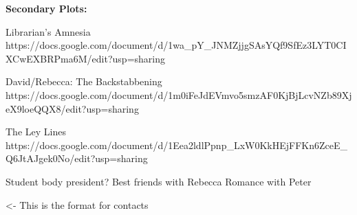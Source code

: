 \documentclass[char]{GL2020}
\begin{document}
\textbf{Secondary Plots:}

Librarian’s Amnesia https://docs.google.com/document/d/1wa_pY_JNMZjjgSAsYQf9SfEz3LYT0CIXCwEXBRPma6M/edit?usp=sharing

David/Rebecca: The Backstabbening https://docs.google.com/document/d/1m0iFeJdEVmvo5smzAF0KjBjLcvNZb89XjeX9loeQQX8/edit?usp=sharing

The Ley Lines  https://docs.google.com/document/d/1Eea2ldlPpnp_LxW0KkHEjFFKn6ZceE_Q6JtAJgek0No/edit?usp=sharing
 

Student body president?	
Best friends with Rebecca
Romance with Peter

\begin{itemz}[Goals]
	\item 
\end{itemz}

\begin{itemz}[Notes]
	\item 
\end{itemz}

\begin{contacts}
	\contact{\cTest{}} <- This is the format for contacts
	
\end{contacts}
\end{document}

